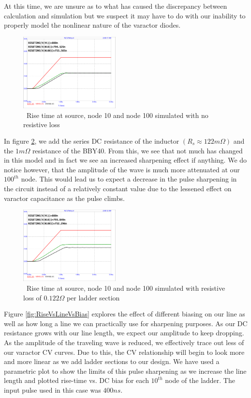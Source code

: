 \documentclass[journal]{IEEEtran}
\begin{document}
At this time, we are unsure as to what has caused the discrepancy between calculation and simulation but we suspect it may have to do with our inability to properly model the nonlinear nature of the varactor diodes. 

\begin{figure}[htb]
\centering
\includegraphics[width=0.45\textwidth,page = 1]{risetimeGuessNOLoss.pdf}
\caption{\ Rise time at source, node 10 and node 100 simulated with no resistive loss
}\label{fig:riseNoLoss}
\end{figure}

In figure \ref{fig:riseWithLoss}, we add the series DC resistance of the inductor $(R_s \approx 122m\Omega)$ and the $1m\Omega$ resistance of the BBY40.  From this, we see that not much has changed in this model and in fact we see an increased sharpening effect if anything. We do notice however, that the amplitude of the wave is much more attenuated at our $100^{th}$ node. This would lead us to expect a decrease in the pulse sharpening in the circuit instead of a relatively constant value due to the lessened effect on varactor capacitance as the pulse climbs.

\begin{figure}[htb]
\centering
\includegraphics[width=0.45\textwidth,page = 1]{risetimeGuessWLoss.pdf}
\caption{\ Rise time at source, node 10 and node 100 simulated with resistive loss of $0.122\Omega$ per ladder section 
}\label{fig:riseWithLoss}
\end{figure}

 
 Figure \ref{fig:RiseVsLineVsBias} explores the effect of different biasing on our line as well as how long a line we can practically use for sharpening purposes. As our DC resistance grows with our line length, we expect our amplitude to keep dropping. As the amplitude of the traveling wave is reduced, we effectively trace out less of our varactor CV curves. Due to this, the CV relationship will begin to look more and more linear as we add ladder sections to our design. We have used a parametric plot to show the limits of this pulse sharpening as we increase  the line length and plotted rise-time vs. DC bias for each $10^{th}$ node of the ladder. The input pulse used in this case was $400ns$. 
\end{document}
